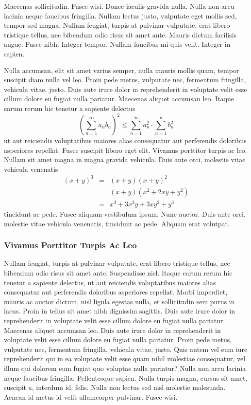 \documentclass[english,master,dept460,male,cpp,cpdeclaration]{diploma}
\begin{document}
Maecenas sollicitudin. Fusce wisi. Donec iaculis gravida nulla. Nulla non arcu lacinia neque faucibus fringilla. Nullam lectus justo, vulputate eget mollis sed, tempor sed magna. Nullam feugiat, turpis at pulvinar vulputate, erat libero tristique tellus, nec bibendum odio risus sit amet ante. Mauris dictum facilisis augue. Fusce nibh. Integer tempor. Nullam faucibus mi quis velit. Integer in sapien.

Nulla accumsan, elit sit amet varius semper, nulla mauris mollis quam, tempor suscipit diam nulla vel leo. Proin pede metus, vulputate nec, fermentum fringilla, vehicula vitae, justo. Duis aute irure dolor in reprehenderit in voluptate velit esse cillum dolore eu fugiat nulla pariatur. Maecenas aliquet accumsan leo. Itaque earum rerum hic tenetur a sapiente delectus
\begin{equation}
\left(\sum_{n=1}^{\infty}a_{n}b_{n}\right)^{2} \leq
\sum_{n=1}^{\infty}a_{n}^{2} \cdot \sum_{n=1}^{\infty}b_{n}^{2}
\label{eq:A}
\end{equation}
ut aut reiciendis voluptatibus maiores alias consequatur aut perferendis doloribus asperiores repellat. Fusce suscipit libero eget elit. Vivamus porttitor turpis ac leo. Nullam sit amet magna in magna gravida vehicula. Duis ante orci, molestie vitae vehicula venenatis
\begin{eqnarray}
(x+y)^{3} & = & (x+y)(x+y)^{2}\label{eq:B}\\
          & = & (x+y)(x^{2}+2xy+y^{2})\nonumber\\
          & = & x^{3}+3x^{2}y+3xy^{2}+y^{3}\label{eq:C}
\end{eqnarray}
tincidunt ac pede. Fusce aliquam vestibulum ipsum. Nunc auctor. Duis ante orci, molestie vitae vehicula venenatis, tincidunt ac pede. Aliquam erat volutpat.

\subsubsection{Vivamus Porttitor Turpis Ac Leo}
Nullam feugiat, turpis at pulvinar vulputate, erat libero tristique tellus, nec bibendum odio risus sit amet ante. Suspendisse nisl. Itaque earum rerum hic tenetur a sapiente delectus, ut aut reiciendis voluptatibus maiores alias consequatur aut perferendis doloribus asperiores repellat. Morbi imperdiet, mauris ac auctor dictum, nisl ligula egestas nulla, et sollicitudin sem purus in lacus. Proin in tellus sit amet nibh dignissim sagittis. Duis aute irure dolor in reprehenderit in voluptate velit esse cillum dolore eu fugiat nulla pariatur. Maecenas aliquet accumsan leo. Duis aute irure dolor in reprehenderit in voluptate velit esse cillum dolore eu fugiat nulla pariatur. Proin pede metus, vulputate nec, fermentum fringilla, vehicula vitae, justo. Quis autem vel eum iure reprehenderit qui in ea voluptate velit esse quam nihil molestiae consequatur, vel illum qui dolorem eum fugiat quo voluptas nulla pariatur? Nulla non arcu lacinia neque faucibus fringilla. Pellentesque sapien. Nulla turpis magna, cursus sit amet, suscipit a, interdum id, felis. Nulla non lectus sed nisl molestie malesuada. Aenean id metus id velit ullamcorper pulvinar. Fusce wisi.
\end{document}
